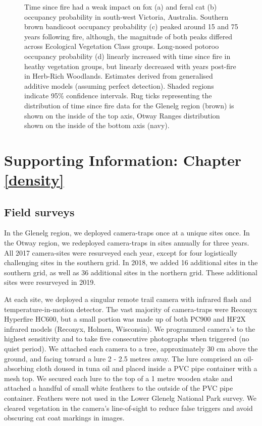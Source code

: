\documentclass[11pt,a4paper,titlepage,twoside,openright]{style/unimelbthesis}
\begin{document}
\begin{mainmatter}
\begin{figure}
{}

\caption{Time since fire had a weak impact on fox (a) and feral cat (b) occupancy probability in south-west Victoria, Australia. Southern brown bandicoot occupancy probability (c) peaked around 15 and 75 years following fire, although, the magnitude of both peaks differed across Ecological Vegetation Class groups. Long-nosed potoroo occupancy probability (d) linearly increased with time since fire in heathy vegetation groups, but linearly decreased with years post-fire in Herb-Rich Woodlands. Estimates derived from generalised additive models (assuming perfect detection). Shaded regions indicate 95\% confidence intervals. Rug ticks representing the distribution of time since fire data for the Glenelg region (brown) is shown on the inside of the top axis, Otway Ranges distribution shown on the inside of the bottom axis (navy).}\label{fig:occ-tsf}
\end{figure}
\hypertarget{density-app}{%
\chapter{Supporting Information: Chapter \ref{density}}\label{density-app}}

\newpage

\hypertarget{density-app-field}{%
\section{Field surveys}\label{density-app-field}}

In the Glenelg region, we deployed camera-traps once at a unique sites once. In the Otway region, we redeployed camera-traps in sites annually for three years. All 2017 camera-sites were resurveyed each year, except for four logistically challenging sites in the southern grid. In 2018, we added 16 additional sites in the southern grid, as well as 36 additional sites in the northern grid. These additional sites were resurveyed in 2019.

At each site, we deployed a singular remote trail camera with infrared flash and temperature-in-motion detector. The vast majority of camera-traps were Reconyx Hyperfire HC600, but a small portion was made up of both PC900 and HF2X infrared models (Reconyx, Holmen, Wisconsin). We programmed camera's to the highest sensitivity and to take five consecutive photographs when triggered (no quiet period). We attached each camera to a tree, approximately 30 cm above the ground, and facing toward a lure 2 - 2.5 metres away. The lure comprised an oil-absorbing cloth doused in tuna oil and placed inside a PVC pipe container with a mesh top. We secured each lure to the top of a 1 metre wooden stake and attached a handful of small white feathers to the outside of the PVC pipe container. Feathers were not used in the Lower Glenelg National Park survey. We cleared vegetation in the camera's line-of-sight to reduce false triggers and avoid obscuring cat coat markings in images.


\end{mainmatter}
\end{document}

